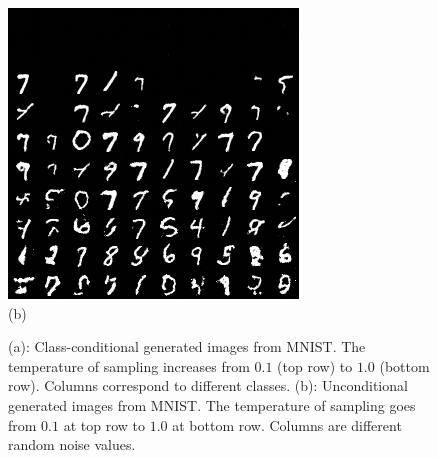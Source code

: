 \begin{figure}[H]
\begin{minipage}{.1\textwidth}
\end{minipage}
\begin{minipage}[right]{.45\textwidth}
    \centering
    \includegraphics[width=.95\textwidth]{figures/MNIST/uncond_dif_temp_mnist.png}
    \\ (b)
\end{minipage}
\centering
\caption{(a): Class-conditional generated images from MNIST. The temperature of sampling increases from $0.1$ (top row) to $1.0$ (bottom row). Columns correspond to different classes. (b): Unconditional generated images from MNIST. The temperature of sampling goes from $0.1$ at top row to $1.0$ at bottom row. Columns are different random noise values.}
    \label{fig:cond_uncond_mnist}

\end{figure}
